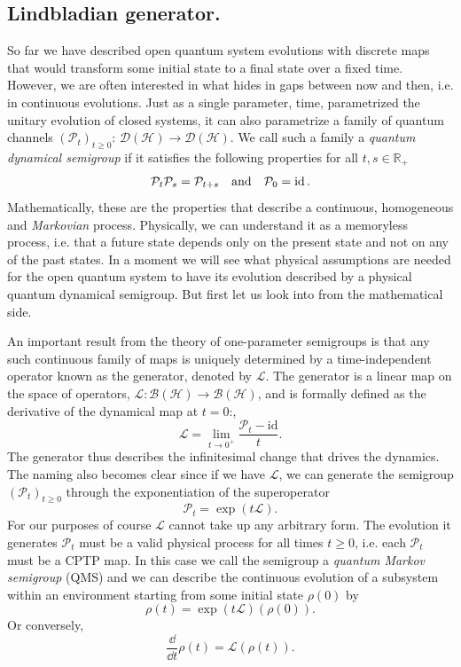 \smallskip
\subsection{Lindbladian generator.} So far we have described open quantum system evolutions with discrete maps that would transform some initial state to a final state over a fixed time. However, we are often interested in what hides in gaps between now and then, i.e. in continuous evolutions. Just as a single parameter, time, parametrized the unitary evolution of closed systems, it can also parametrize a family of quantum channels $(\mathcal{P}_t)_{t\geq 0}$: $\mathcal{D}(\mathcal{H}) \rightarrow \mathcal{D}(\mathcal{H})$. We call such a family a \textit{quantum dynamical semigroup} if it satisfies the following properties for all $t, s \in \mathbb{R}_+$
$$
\mathcal{P}_t\mathcal{P}_s = \mathcal{P}_{t + s} \quad\text{and}\quad \mathcal{P}_0 = \operatorname{id}.
$$
Mathematically, these are the properties that describe a continuous, homogeneous and \textit{Markovian} process. Physically, we can understand it as a memoryless process, i.e. that a future state depends only on the present state and not on any of the past states. In a moment we will see what physical assumptions are needed for the open quantum system to have its evolution described by a physical quantum dynamical semigroup. But first let us look into from the mathematical side.

An important result from the theory of one-parameter semigroups is that any such continuous family of maps is uniquely determined by a time-independent operator 
known as the generator, denoted by $\mathcal{L}$. The generator is a linear map on the space of operators, $\mathcal{L}: \mathcal{B}(\mathcal{H})\rightarrow \mathcal{B}(\mathcal{H})$, and is formally defined as the derivative of the dynamical map at $t=0$:, 
\begin{equation}
\mathcal{L} = \lim_{t \to 0^+} \frac{\mathcal{P}_t - \mathrm{id}}{t}.
\end{equation}
The generator thus describes the infinitesimal change that drives the dynamics. The naming also becomes clear since if we have $\mathcal{L}$, we can generate the semigroup $(\mathcal{P}_t)_{t\geq 0}$ through the exponentiation of the superoperator
\begin{equation}
    \mathcal{P}_t = \exp (t \mathcal{L}).
\end{equation}
For our purposes of course $\mathcal{L}$ cannot take up any arbitrary form. The evolution it generates $\mathcal{P}_t$ must be a valid physical process for all times $t \geq 0$, i.e. each $\mathcal{P}_t$ must be a CPTP map. In this case we call the semigroup a \textit{quantum Markov semigroup} (QMS) and we can describe the continuous evolution of a subsystem within an environment starting from some initial state $\rho(0)$ by
\begin{equation}
    \label{eq:oqs-evo-with-L}
    \rho(t) = \exp(t \mathcal{L})(\rho(0)).
\end{equation}
Or conversely,
\begin{equation}
    \frac{\dd}{\dd t}\rho(t) = \mathcal{L}(\rho(t)).
\end{equation}

